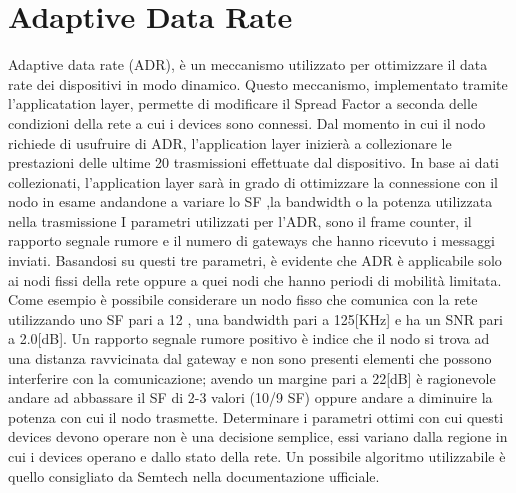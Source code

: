 \section{Adaptive Data Rate}
Adaptive data rate (ADR), è un meccanismo utilizzato per ottimizzare il data
rate dei dispositivi in modo dinamico. Questo meccanismo, implementato tramite
l'applicatation layer, permette di modificare il Spread Factor a seconda delle
condizioni della rete a cui i devices sono connessi. Dal momento in cui il nodo
richiede di usufruire di ADR, l'application layer inizierà a
collezionare le prestazioni delle ultime 20 trasmissioni effettuate dal
dispositivo.
In base ai dati collezionati, l'application layer sarà in grado di ottimizzare
la connessione con il nodo in esame andandone a variare lo SF ,la bandwidth o la
potenza utilizzata nella trasmissione I parametri utilizzati per l'ADR, 
sono il frame counter, il
rapporto segnale rumore e il numero di gateways che hanno ricevuto i messaggi
inviati.  Basandosi su questi tre parametri, è evidente che ADR è applicabile
solo ai nodi fissi della rete oppure a quei nodi che hanno periodi di mobilità
limitata.  Come esempio è possibile considerare un nodo fisso che comunica con
la rete utilizzando uno SF pari a 12 , una bandwidth pari a 125[KHz] e ha un SNR
pari a 2.0[dB]. Un rapporto segnale rumore positivo è indice che il nodo si
trova ad una distanza ravvicinata dal gateway e non sono presenti elementi che
possono interferire con la comunicazione; avendo un margine pari a 22[dB] è
ragionevole andare ad abbassare il SF di 2-3 valori (10/9 SF) oppure andare a
diminuire la potenza con cui il nodo trasmette. Determinare i parametri ottimi
con cui questi devices devono operare non è una decisione semplice, essi
variano dalla regione in cui i devices operano e dallo stato della rete. Un possibile
algoritmo utilizzabile è quello consigliato da Semtech nella documentazione
ufficiale.

